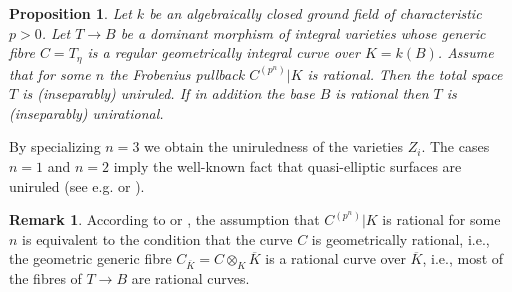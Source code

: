 \documentclass[12pt,reqno]{amsart}
\newtheorem{prop}[thm]{Proposition}
\theoremstyle{definition}
\newtheorem{rem}[thm]{Remark}
\newcommand{\ov}{\overline}
\begin{document}
\begin{prop}\label{2024_09_26_19:35}
Let $k$ be an algebraically closed ground field of characteristic $p>0$.
Let $T\to B$ be a dominant morphism of integral varieties whose generic fibre $C=T_\eta$ is a regular geometrically integral curve over $K=k(B)$.
Assume that for some $n$ the Frobenius pullback $C^{(p^n)}|K$ is rational.
Then the total space $T$ is (inseparably) uniruled.
If in addition the base $B$ is rational then $T$ is (inseparably) unirational.
\end{prop}

By specializing $n=3$ we obtain the uniruledness of the varieties $Z_i$.
The cases $n=1$ and $n=2$ imply the well-known fact that quasi-elliptic surfaces are uniruled (see e.g. \cite[Theorem~9.4]{Lied13} or \cite[Corollary~4.1.16]{CDL23}).

\begin{rem}
According to \cite[Lemma~1.2]{Sc09} or \cite[Corollary~2.7]{HiSt22}, the assumption that $C^{(p^n)}|K$ is rational for some $n$ is equivalent to the condition that the curve $C$ is geometrically rational, i.e., the geometric generic fibre $C_{\ov K}=C\otimes_K \ov K$ is a rational curve over $\ov K$, i.e., most of the fibres of $T\to B$ are rational curves.
\end{rem}
\end{document}
